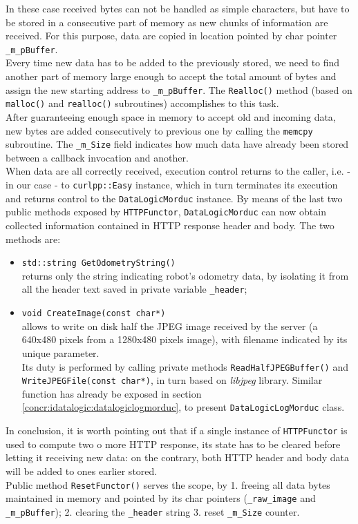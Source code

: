 In these case received bytes can not be handled as simple characters,
but have to be stored in a consecutive part of memory as new chunks
of information are received. For this purpose, data are copied in location
pointed by char pointer \texttt{\_m\_pBuffer}.
\\
Every time new data has to be added to the previously stored, we need
to find another part of memory large enough to accept the total amount of
bytes and assign the new starting address to \texttt{\_m\_pBuffer}. The
\texttt{Realloc()} method (based on \texttt{malloc()} and
\texttt{realloc()} subroutines) accomplishes to this task.
\\
After guaranteeing enough space in memory to accept old and incoming data,
new bytes
are added consecutively to previous one by calling the \texttt{memcpy}
subroutine. The \texttt{\_m\_Size} field indicates how much data
have already been stored between a callback invocation and another.
\\
When data are all correctly received, execution control returns to the
caller, i.e. - in our case - to \texttt{curlpp::Easy} instance, which
in turn terminates its execution and returns control to the
\texttt{DataLogicMorduc} instance. By means
of the last two public methods exposed by \texttt{HTTPFunctor},
\texttt{DataLogicMorduc}
can now obtain collected information contained in HTTP response header and
body. The two methods are:

\begin{itemize}

  \item \texttt{std::string GetOdometryString()} \\
    returns only the string indicating robot's odometry data,
    by isolating it from all the header text saved in private
    variable \texttt{\_header};

  \item \texttt{void CreateImage(const char*)} \\
    allows to write on disk half the JPEG image received
    by the server (a 640x480 pixels from a 1280x480 pixels image), with
    filename indicated by its unique parameter. \\
    Its duty is performed by calling private methods
    \texttt{ReadHalfJPEGBuffer()} and \texttt{WriteJPEGFile(const char*)},
    in turn based on \textit{libjpeg} library. Similar function has
    already be exposed in section \ref{concr:idatalogic:datalogiclogmorduc},
    to present \texttt{DataLogicLogMorduc} class.

\end{itemize}

In conclusion, it is worth pointing out that if a single instance of
\texttt{HTTPFunctor} is used to compute two o more HTTP response,
its state has to be cleared before letting it receiving new data: on the contrary,
both HTTP header and body data will be added to ones earlier stored.
\\
Public method \texttt{ResetFunctor()} serves the scope, by 1. freeing all
data bytes maintained in memory and pointed by its char pointers
(\texttt{\_raw\_image} and \texttt{\_m\_pBuffer}); 2. clearing the
\texttt{\_header} string 3. reset \texttt{\_m\_Size} counter.
